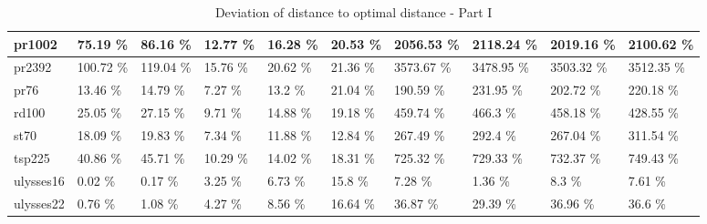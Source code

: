 \documentclass[conference]{IEEEtran}
\begin{document}
\begin{table}[h]
\begin{adjustbox}{width=\columnwidth}
\begin{tabular}{ | l | l | l | l | l | l | l | l | l | l | }
pr1002 & 75.19 \% & 86.16 \% & 12.77 \% & 16.28 \% & 20.53 \% & 2056.53 \% & 2118.24 \% & 2019.16 \% & 2100.62 \%   \\ \hline
pr2392 & 100.72 \% & 119.04 \% & 15.76 \% & 20.62 \% & 21.36 \% & 3573.67 \% & 3478.95 \% & 3503.32 \% & 3512.35 \%   \\ \hline
pr76 & 13.46 \% & 14.79 \% & 7.27 \% & 13.2 \% & 21.04 \% & 190.59 \% & 231.95 \% & 202.72 \% & 220.18 \%   \\ \hline
rd100 & 25.05 \% & 27.15 \% & 9.71 \% & 14.88 \% & 19.18 \% & 459.74 \% & 466.3 \% & 458.18 \% & 428.55 \%   \\ \hline
st70 & 18.09 \% & 19.83 \% & 7.34 \% & 11.88 \% & 12.84 \% & 267.49 \% & 292.4 \% & 267.04 \% & 311.54 \%   \\ \hline
tsp225 & 40.86 \% & 45.71 \% & 10.29 \% & 14.02 \% & 18.31 \% & 725.32 \% & 729.33 \% & 732.37 \% & 749.43 \%   \\ \hline
ulysses16 & 0.02 \% & 0.17 \% & 3.25 \% & 6.73 \% & 15.8 \% & 7.28 \% & 1.36 \% & 8.3 \% & 7.61 \%   \\ \hline
ulysses22 & 0.76 \% & 1.08 \% & 4.27 \% & 8.56 \% & 16.64 \% & 36.87 \% & 29.39 \% & 36.96 \% & 36.6 \%   \\ \hline
	    \end{tabular}
	    \end{adjustbox}
	    \caption{Deviation of distance to optimal distance - Part I}
	    \label{tab:deviationp1}
	\end{table}
	
\end{document}
